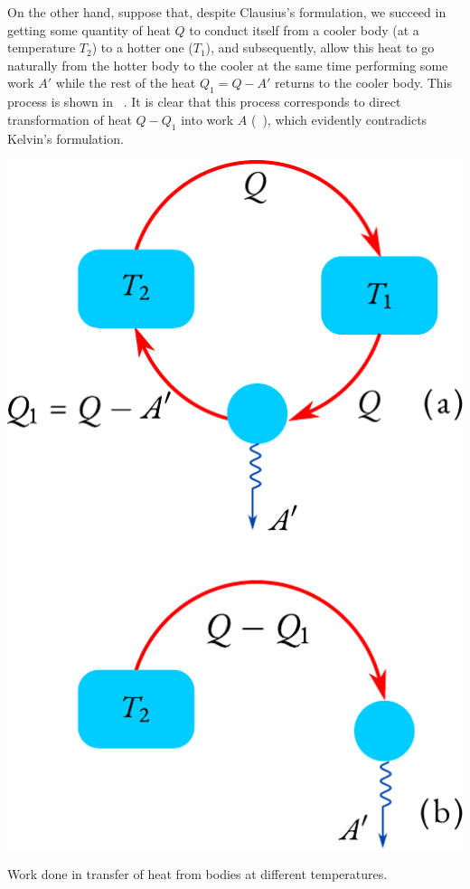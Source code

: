 On the other hand, suppose that, despite Clausius's formulation, we succeed in getting some quantity of heat $Q$ to conduct itself from a cooler body (at a temperature $T_{2}$) to a hotter one ($T_{1}$), and subsequently, allow this heat to go naturally from the hotter body to the cooler at the same time performing some work $A'$ while the rest of the heat $Q_{1} = Q - A'$ returns to the cooler body. This process is shown in ~. It is clear that this process corresponds to direct transformation of heat $Q - Q_{1}$ into work $A$ (~), which evidently contradicts Kelvin's formulation.

\begin{marginfigure}[-2cm]%
\centering
\includegraphics[width=\textwidth]{figures/perp.pdf}
\caption{Work done in transfer of heat from bodies at different temperatures.}
\label{perp}
\end{marginfigure}

